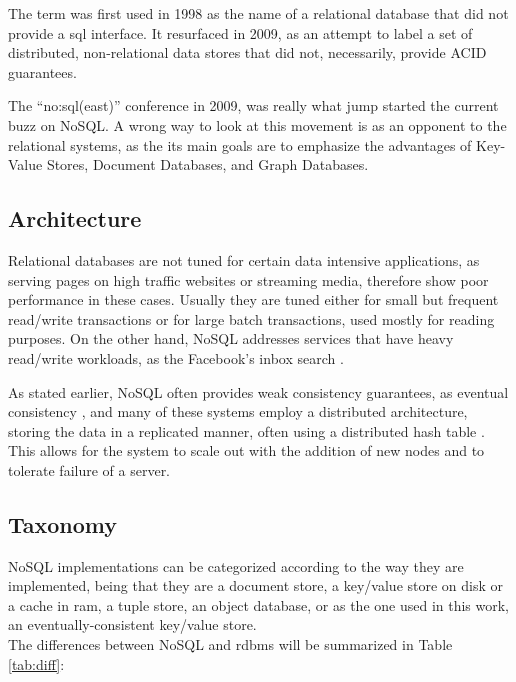 The term was first used in 1998 as the name of a relational database that did not provide a \ac{sql} interface. It resurfaced in 2009, as an attempt to label a set of distributed, non-relational data stores that did not, necessarily, provide ACID guarantees.

The ``no:sql(east)'' conference in 2009, was really what jump started the current buzz on NoSQL. A wrong way to look at this movement is as an opponent to the relational systems, as the its main goals are to emphasize the advantages of Key-Value Stores, Document Databases, and Graph Databases.

\subsection{Architecture}
Relational databases are not tuned for certain data intensive applications, as serving pages on high traffic websites or streaming media, therefore show poor performance in these cases. Usually they are tuned either for small but frequent read/write transactions or for large batch transactions, used mostly for reading purposes. On the other hand, NoSQL addresses services that have heavy read/write workloads, as the Facebook's inbox search \cite{lakshmanMalik}.

As stated earlier, NoSQL often provides weak consistency guarantees, as eventual consistency \cite{Vogels2008}, and many of these systems employ a distributed architecture, storing the data in a replicated manner, often using a distributed hash table \cite{Tanner}. This allows for the system to scale out with the addition of new nodes and to tolerate failure of a server.

\subsection{Taxonomy}
NoSQL implementations can be categorized according to the way they are implemented, being that they are a document store, a key/value store on disk or a cache in \ac{ram}, a tuple store, an object database, or as the one used in this work, an eventually-consistent key/value store.\\

The differences between NoSQL and \ac{rdbms} will be summarized in Table \ref{tab:diff}:\\

